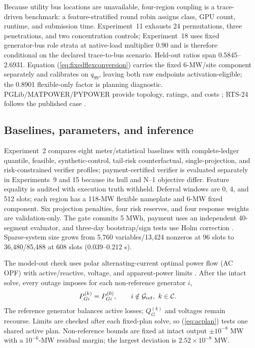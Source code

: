 \documentclass[10pt,journal]{IEEEtran}
\newcommand{\RiskSafe}{risk-constrained verifier}
\newcommand{\TailRisk}{tail-risk counterfactual}
\newcommand{\PaymentSafe}{payment-certified verifier}
\begin{document}
Because utility bus locations are unavailable, four-region coupling is a
trace-driven benchmark: a feature-stratified round robin assigns class, GPU
count, runtime, and submission time. Experiment~11 exhausts 24 permutations,
three penetrations, and two concentration controls; Experiment~18 uses
fixed generator-bus role strata at native-load multiplier 0.90 and is therefore
conditional on the declared trace-to-bus scenario. Held-out ratios span
0.5845--2.6931. Equation (\ref{eq:fixedflexconversion}) carries the fixed
6-MW/site component separately and calibrates on $q_{99}$, leaving both raw
endpoints activation-eligible; the 0.8901 flexible-only factor is planning
diagnostic. PGLib/MATPOWER/PYPOWER provide topology, ratings, and costs
\cite{babaeinejadsarookolaee2021pglib,zimmerman2011matpower}; RTS-24 follows
the published case \cite{grigg1999rts}.

\subsection{Baselines, parameters, and inference}

Experiment~2 compares eight meter/statistical baselines with complete-ledger
quantile, feasible, synthetic-control, \TailRisk, single-projection, and
\RiskSafe{} profiles; \PaymentSafe{} is evaluated separately in Experiments~9
and 15 because its hull and N--1 objective differ. Feature equality is audited
with execution truth withheld. Deferral windows are 0, 4, and 512 slots; each
region has a 118-MW flexible nameplate and 6-MW fixed component. Six projection
penalties, four risk reserves, and four response weights are validation-only.
The gate commits 5 MWh, payment uses an independent 40-segment evaluator, and
three-day bootstrap/sign tests use Holm correction
\cite{kunsch1989bootstrap,holm1979multiple}. Sparse-system size grows from
5,760 variables/13,424 nonzeros at 96 slots to 36,480/85,488 at 608 slots
(0.039--0.212 s).

The model-out check uses polar alternating-current optimal power flow (AC OPF)
with active/reactive, voltage, and apparent-power limits
\cite{zimmerman2011matpower}. After the intact solve, every outage imposes
for each non-reference generator $i$,
\begin{equation}
 P_{Gi}^{(k)}=P_{Gi}^{(0)},\qquad i\notin\mathcal G_{\rm ref},\ k\in\mathcal C.
 \label{eq:acplan}
\end{equation}
The reference generator balances active losses; $Q_G^{(k)}$ and voltages remain
recourse. Limits are checked after each fixed-plan solve, so
(\ref{eq:acplan}) tests one shared active plan. Non-reference bounds are fixed
at intact output $\pm10^{-8}$ MW with a $10^{-6}$-MW residual margin; the largest
deviation is $2.52\times10^{-8}$ MW.
\end{document}
